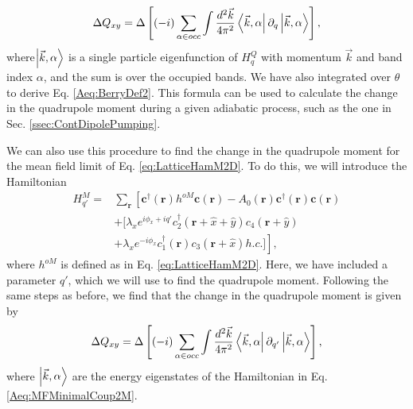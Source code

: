 \documentclass[prb,aps,twocolumn,groupaddress,floatfix]{revtex4-1}
\begin{document}
\begin{equation}\begin{split}
\Delta Q_{xy} = \Delta\left[(-i) \sum_{\alpha \in occ} \int \frac{d^2\vec{k}}{4\pi^2} \bra{\vec{k},\alpha}\partial_q \ket{\vec{k},\alpha}\right],
\end{split}\label{Aeq:BerryDef2}
\end{equation}
where$\ket{\vec{k},\alpha}$ is a single particle eigenfunction of $H^Q_{q}$ with momentum $\vec{k}$ and band index $\alpha$, and the sum is over the occupied bands. We have also integrated over $\theta$ to derive Eq. \ref{Aeq:BerryDef2}. This formula can be used to calculate the change in the quadrupole moment during a given adiabatic process, such as the one in Sec. \ref{ssec:ContDipolePumping}.


We can also use this procedure to find the change in the quadrupole moment for the mean field limit of Eq. \ref{eq:LatticeHamM2D}. To do this, we will introduce the Hamiltonian 
\begin{equation}
\begin{split}
H^{ M }_{q'} = &\sum_{\bm{r}}\left[ \bm{c}^\dagger(\bm{r}) h^{oM} \bm{c}(\bm{r}) - A_0(\bm{r}) \bm{c}^\dagger(\bm{r}) \bm{c}(\bm{r})\right.\\&+[\lambda_x e^{i \phi_x + i q'}c_2^\dagger(\bm{r}+\hat{x}+\hat{y})c_4(\bm{r}+\hat{y})\\& +\left. \lambda_x e^{-i \phi_x } c_1^\dagger(\bm{r})c_3(\bm{r}+\hat{x}) h.c.]\right],
\end{split}\label{Aeq:MFMinimalCoup2M}
\end{equation} where $h^{oM} $ is defined as in Eq. \ref{eq:LatticeHamM2D}. Here, we have included a parameter $q'$, which we will use to find the quadrupole moment. Following the same steps as before, we find that the change in the quadrupole moment is given by
\begin{equation}\begin{split}
\Delta Q_{xy} = \Delta \left[(-i) \sum_{\alpha \in occ} \int \frac{d^2\vec{k}}{4\pi^2} \bra{\vec{k},\alpha}\partial_{q'} \ket{\vec{k},\alpha}\right],
\end{split}\label{Aeq:BerryDef2M}
\end{equation} where $\ket{\vec{k},\alpha}$ are the energy eigenstates of the Hamiltonian in Eq. \ref{Aeq:MFMinimalCoup2M}.
\end{document}

